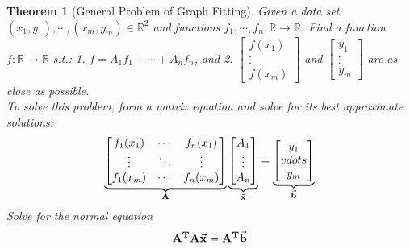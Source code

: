 \documentclass[12pt, a4paper]{article}
\newtheorem{thm}{Theorem}[subsection]
\def\R{{\mathbb{R}}}
\def\T{{\vb{T}}}
\def\vecx{\va{x}}
\def\vecb{\va{b}}
\def\matrixA{\vb{A}}
\begin{document}
\begin{thm}[General Problem of Graph Fitting] 
	Given a data set $(x_1,y_1),\cdots,(x_m,y_m)\in\R^2$ and functions $f_1,\cdots,f_n:\R\to\R$. Find a function $f:\R\to\R$ \emph{s.t.}: 1. $f=A_1f_1+\cdots+A_nf_n$, and 2. $\begin{bmatrix}f(x_1)\\\vdots\\f(x_m)\end{bmatrix}$ and $\begin{bmatrix}y_1\\\vdots\\y_m\end{bmatrix}$ are as close as possible.\\
	To solve this problem, form a matrix equation and solve for its best approximate solutions: 
	\[\underbrace{\begin{bmatrix}f_1(x_1)&\cdots&f_n(x_1)\\\vdots&\ddots&\vdots\\f_1(x_m)&\cdots&f_n(x_m)\end{bmatrix}}_{\matrixA}\underbrace{\begin{bmatrix}A_1\\\vdots\\A_n\end{bmatrix}}_{\vecx}=\underbrace{\begin{bmatrix}y_1\\vdots\\y_m\end{bmatrix}}_{\vecb}\]	
	Solve for the normal equation \[\matrixA^\T\matrixA\vecx=\matrixA^\T\vecb\]
\end{thm}
\end{document}
